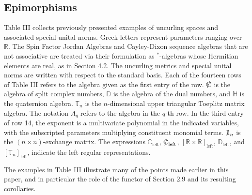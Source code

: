 \documentclass{amsart}
\numberwithin{equation}{section}
\theoremstyle{definition}
\numberwithin{theorem}{section}
\begin{document}
\subsection{Epimorphisms} Table III collects previously presented examples of uncurling spaces and associated special unital norms.  Greek letters represent parameters ranging over $\mathbb{R}$.  The Spin Factor Jordan Algebras and Cayley-Dixon sequence algebras that are not associative are treated via their formulation as \mbox{$^*$-algebras} whose Hermitian elements are real, as in Section 4.2. The uncurling metrics and special unital norms are written with respect to the standard basis.  Each of the fourteen rows of Table III refers to the algebra given as the first entry of the row.  $\slashed{\mathbb{C}}$ is the algebra of split complex numbers, $\mathbb{D}$ is the algebra of the dual numbers, and $\mathbb{H}$ is the quaternion algebra.  $\mathbb{T}_n$ is the $n$-dimensional upper triangular Toeplitz matrix algebra.  The notation $A_q$ refers to the algebra in the $q$-th row.  In the third entry of row 14, the exponent is a multivariate polynomial in the indicated variables, with the subscripted parameters multiplying constituent monomial terms.  $\slashed{\mathbf{1}}_n$ is the $(n\times n)$-exchange matrix.  The expressions $\mathbb{C}_\text{left}$, $\slashed{\mathbb{C}}_\text{left}$, $[\mathbb{R}\times\mathbb{R}]_\text{left}$, $\mathbb{D}_\text{left}$, and $[\mathbb{T}_n]_\text{left}$, indicate the left regular representations.  


\bigskip

The examples in Table III illustrate many of the points made earlier in this paper, and in particular the role of the functor of Section 2.9 and its resulting corollaries.    
 
\end{document}
